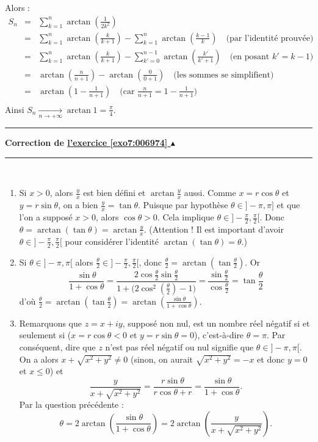 \documentclass[11pt,a4paper]{article}
\renewcommand{\le}{\leqslant} \renewcommand{\leq}{\leqslant}
\newcommand{\Arctan}{\mathop{\mathrm{arctan}}\nolimits}
\newcounter{exo}
\newcommand{\correction}[1]{\hypertarget{cor7:#1}{}\label{cor7:#1}{\bf Correction de \hyperlink{exo7:#1}{l'exercice \ref{exo7:#1} $\blacktriangle$}}\vspace{1mm}\hrule\vspace{1mm}}
\newcommand{\fincorrection}{\vspace{1mm}\hrule\vspace*{7mm}}
\begin{document}
Alors :
\begin{eqnarray*}
S_n
 &=&\sum_{k=1}^n\Arctan\left(\frac{1}{2k^2}\right)\\
 &=&\sum_{k=1}^n\Arctan\left(\frac{k}{k+1}\right)-\sum_{k=1}^n\Arctan\left(\frac{k-1}{k}\right)
 \quad \text{(par l'identité prouvée)}\\
 &=&\sum_{k=1}^n\Arctan\left(\frac{k}{k+1}\right)-\sum_{k'=0}^{n-1}\Arctan\left(\frac{k'}{k'+1}\right)
 \quad \text{(en posant $k'=k-1$)}\\
 &=&\Arctan\left(\frac{n}{n+1}\right)-\Arctan\left(\frac{0}{0+1}\right)
 \quad \text{(les sommes se simplifient)}\\
 &=&\Arctan\left(1-\frac{1}{n+1}\right)
 \quad \text{(car $\tfrac{n}{n+1} = 1-\tfrac{1}{n+1}$)} \\
\end{eqnarray*} 
Ainsi $S_n\xrightarrow[n\to +\infty]{}\Arctan 1=\frac{\pi}{4}$.
\fincorrection
\correction{006974}\
\begin{enumerate}
\item Si $x>0$, alors $\frac{y}{x}$ est bien défini et $\Arctan\frac{y}{x}$ aussi. 
Comme $x=r\cos\theta$ et $y=r\sin\theta$, on a bien $\frac{y}{x}=\tan\theta$.
Puisque par hypothèse $\theta\in]-\pi,\pi]$ et que l'on a supposé $x>0$,
alors $\cos\theta>0$.
Cela implique $\theta\in]-\frac{\pi}{2},\frac{\pi}{2}[$. 
Donc $\theta=\Arctan(\tan\theta)=\Arctan\frac{y}{x}$. (Attention ! Il est important
d'avoir $\theta\in]-\frac{\pi}{2},\frac{\pi}{2}[$ pour considérer l'identité 
$\Arctan(\tan\theta) = \theta$.)


\item Si $\theta\in]-\pi,\pi[$ alors $\frac{\theta}{2}\in]-\frac{\pi}{2},\frac{\pi}{2}[$, 
donc $\frac{\theta}{2}=\Arctan\left(\tan\frac{\theta}{2}\right)$. Or 
$$\frac{\sin\theta}{1+\cos\theta}=
\frac{2\cos\frac{\theta}{2}\sin\frac{\theta}{2}}{1+\big(2\cos^2\left(\frac{\theta}{2}\right)-1\big)}
=\frac{\sin\frac{\theta}{2}}{\cos\frac{\theta}{2}}=\tan\frac{\theta}{2}$$
d'où $\frac\theta2=\Arctan\left(\tan\frac{\theta}{2}\right)=\Arctan\left(\frac{\sin\theta}{1+\cos\theta}\right)$.

\item Remarquons que $z=x+iy$, supposé non nul, est un nombre réel négatif si et seulement si 
($x=r\cos\theta< 0$ et $y=r\sin\theta=0$), c'est-à-dire $\theta=\pi$. 
Par conséquent, dire que $z$ n'est pas réel négatif ou nul signifie que 
$\theta\in]-\pi,\pi[$. On a alors $x+\sqrt{x^2+y^2}\not=0$ (sinon, on aurait $\sqrt{x^2+y^2}=-x$ 
et donc $y=0$ et $x\le 0$) et 
$$\frac{y}{x+\sqrt{x^2+y^2}}=\frac{r\sin\theta}{r\cos\theta+r}=\frac{\sin\theta}{1+\cos\theta}.$$
Par la question précédente :
$$\theta = 2\Arctan\left(\frac{\sin\theta}{1+\cos\theta}\right) = 2\Arctan\left(\frac{y}{x+\sqrt{x^2+y^2}}\right).$$

\end{enumerate}
\end{document}
